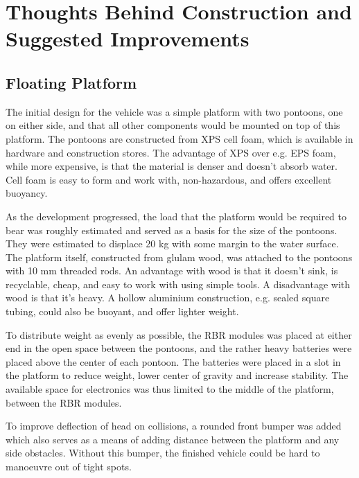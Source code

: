 \section{Thoughts Behind Construction and Suggested Improvements}
\subsection{Floating Platform}
The initial design for the vehicle was a simple platform with two pontoons, one on either side, and that all other components would be mounted on top of this platform.  The pontoons are constructed from XPS cell foam, which is available in hardware and construction stores. The advantage of XPS over e.g. EPS foam, while more expensive, is that the material is denser and doesn’t absorb water. Cell foam is easy to form and work with, non-hazardous, and offers excellent buoyancy.

As the development progressed, the load that the platform would be required to bear was roughly estimated and served as a basis for the size of the pontoons. They were estimated to displace 20 kg with some margin to the water surface. The platform itself, constructed from glulam wood, was attached to the pontoons with 10 mm threaded rods. An advantage with wood is that it doesn’t sink, is recyclable, cheap, and easy to work with using simple tools. A disadvantage with wood is that it’s heavy. A hollow aluminium construction, e.g. sealed square tubing, could also be buoyant, and offer lighter weight. 

To distribute weight as evenly as possible, the RBR modules was placed at either end in the open space between the pontoons, and the rather heavy batteries were placed above the center of each pontoon. The batteries were placed in a slot in the platform to reduce weight, lower center of gravity and increase stability. The available space for electronics was thus limited to the middle of the platform, between the RBR modules.

To improve deflection of head on collisions, a rounded front bumper was added which also serves as a means of adding distance between the platform and any side obstacles. Without this bumper, the finished vehicle could be hard to manoeuvre out of tight spots.


